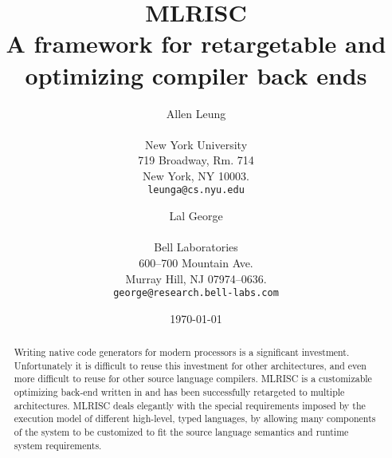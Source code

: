 \documentclass{article}
\begin{document}
   \title{\bf \LARGE MLRISC \\ \large A framework for retargetable and optimizing compiler back ends}  
   \author{\begin{tabular}{c}
            Allen Leung \\ \\
            New York University \\
            719 Broadway, Rm. 714 \\ 
            New York, NY 10003. \\
            {\tt leunga@cs.nyu.edu}
           \end{tabular}
        \and 
           \begin{tabular}{c}
            Lal George \\ \\
            Bell Laboratories \\
            600--700 Mountain Ave. \\
            Murray Hill, NJ 07974--0636. \\
            {\tt george@research.bell-labs.com}
            \end{tabular}
     }

   \date{\today}
   

   \maketitle

   \begin{abstract}
Writing native code generators for modern processors is a significant
investment.  Unfortunately it is difficult
to reuse this investment for other architectures, and even more
difficult to reuse for other source language compilers.   MLRISC is
a customizable optimizing back-end written in
and has been successfully retargeted to multiple architectures.
MLRISC deals elegantly with the special requirements imposed by the
execution model of different high-level, typed languages, by allowing
many components of the system to be customized to fit the source language
semantics and runtime system requirements.
   \end{abstract}
   \tableofcontents
   \newpage




















\end{document}
